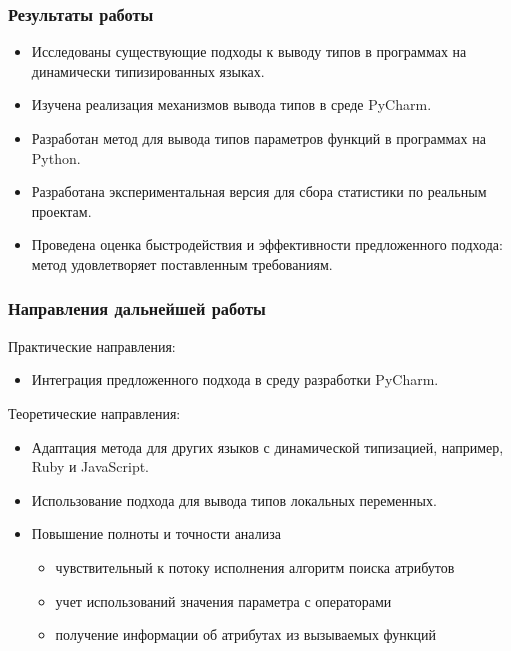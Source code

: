 \documentclass[handout]{beamer}
\begin{document}
\begin{frame}
  \frametitle{Результаты работы}

  \begin{itemize}
      \item Исследованы существующие подходы к выводу типов в программах на
        динамически типизированных языках.

      \item Изучена реализация механизмов вывода типов в среде PyCharm.

      \item Разработан метод для вывода типов параметров функций в программах на
        Python.

      \item Разработана экспериментальная версия для сбора статистики по
        реальным проектам.

      \item Проведена оценка быстродействия и эффективности предложенного
        подхода: метод удовлетворяет поставленным требованиям.
  \end{itemize}
    
\end{frame}


\begin{frame}
  \frametitle{Направления дальнейшей работы}

  Практические направления:
  \begin{itemize}
    \item Интеграция предложенного подхода в среду разработки PyCharm.
  \end{itemize}

  Теоретические направления:
  \begin{itemize}
      \item Адаптация метода для других языков с динамической типизацией,
        например, Ruby и JavaScript.

      \item Использование подхода для вывода типов локальных переменных.
      
      \item Повышение полноты и точности анализа
        \begin{itemize}
            \item чувствительный к потоку исполнения алгоритм поиска атрибутов
            \item учет использований значения параметра с операторами
            \item получение информации об атрибутах из вызываемых функций
        \end{itemize}

  \end{itemize}
    
\end{frame}
\end{document}
